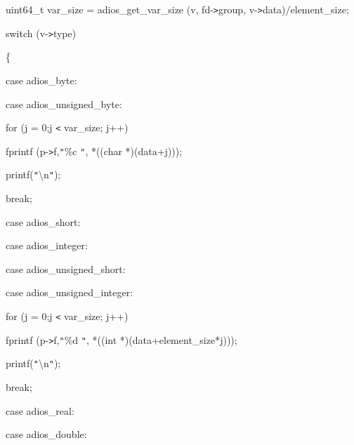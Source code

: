 \vspace{10pt}
uint64\_t var\_size = adios\_get\_var\_size (v, fd-\texttt{>}group, v-\texttt{>}data)/element\_size;

\vspace{10pt}
\parindent=57pt
switch (v-\texttt{>}type)

\vspace{10pt}
\parindent=28pt
\{

\vspace{10pt}
\parindent=43pt
case adios\_byte:

\vspace{10pt}
case adios\_unsigned\_byte:

\vspace{10pt}
\parindent=100pt
for (j = 0;j \texttt{<} var\_size; j++)

\vspace{10pt}
\parindent=72pt
fprintf (p-\texttt{>}f,\texttt{"}\%c \texttt{"}, *((char *)(data+j)));

\vspace{10pt}
\parindent=57pt
printf(\texttt{"}\textbackslash{}n\texttt{"});

\vspace{10pt}
break;

\vspace{10pt}
\parindent=100pt
case adios\_short:

\vspace{10pt}
\parindent=43pt
case adios\_integer:

\vspace{10pt}
case adios\_unsigned\_short:

\vspace{10pt}
\parindent=86pt
case adios\_unsigned\_integer:

\vspace{10pt}
\parindent=57pt
for (j = 0;j \texttt{<} var\_size; j++)

\vspace{10pt}
\parindent=72pt
fprintf (p-\texttt{>}f,\texttt{"}\%d \texttt{"}, *((int *)(data+element\_size*j)));

\vspace{10pt}
\parindent=57pt
printf(\texttt{"}\textbackslash{}n\texttt{"});

\vspace{10pt}
break;

\vspace{10pt}
\parindent=100pt
case adios\_real:

\vspace{10pt}
\parindent=43pt
case adios\_double:

